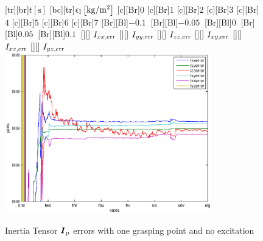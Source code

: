\begin{figure}
	\centering	
	[tr][br]{$t\left[\mathrm{s}\right]$}
	[bc][tr]{$\epsilon_{\mathrm{I}}\left[\mathrm{kg}/\mathrm{m}^2\right]$}
	[Br]{$0$}
	[Br]{$1$}
	[Br]{$2$}
	[Br]{$3$}
	[Br]{$4$}
	[Br]{$5$}
	[Br]{$6$}
	[Br]{$7$}
	[Br][Bl]{$-0.1\  $}
	[Br][Bl]{$-0.05\ $}
	[Br][Bl]{$0\  $}
	[Br][Bl]{$0.05\  $}
	[Br][Bl]{$0.1\  $}
	[][]{\tiny \hspace{0.5cm} $I_{xx,\mathrm{err}}$}
	[][]{\tiny \hspace{0.5cm} $I_{yy,\mathrm{err}}$}
	[][]{\tiny \hspace{0.5cm} $I_{zz,\mathrm{err}}$}
	[][]{\tiny \hspace{0.5cm} $I_{xy,\mathrm{err}}$}
	[][]{\tiny \hspace{0.5cm} $I_{xz,\mathrm{err}}$}
	[][]{\tiny \hspace{0.5cm} $I_{yz,\mathrm{err}}$}
	\includegraphics[width=0.8\textwidth]{figures/one_grasping_point_no_movement_inertias.eps}
	\vspace{0.2cm}
	\caption[Inertia errors, one grasping point, no excitation]{Inertia Tensor $\boldsymbol{I}_{\mathrm{p}}$ errors with one grasping point and no excitation}
	\label{fig:estim_inertia_one_no_movement}
\end{figure}

